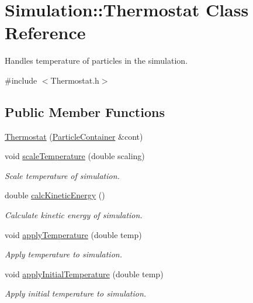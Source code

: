\hypertarget{classSimulation_1_1Thermostat}{\section{Simulation\-:\-:Thermostat Class Reference}
\label{classSimulation_1_1Thermostat}
}


Handles temperature of particles in the simulation.  




{\ttfamily \#include $<$Thermostat.\-h$>$}

\subsection*{Public Member Functions}
\begin{DoxyCompactItemize}
\item 
\hyperlink{classSimulation_1_1Thermostat_a3132362562357ff26f7bb02fa9ed59e0}{Thermostat} (\hyperlink{classSimulation_1_1ParticleContainer}{Particle\-Container} \&cont)
\item 
void \hyperlink{classSimulation_1_1Thermostat_a6d7ef0a0e8dc0aadee57630d63938f7d}{scale\-Temperature} (double scaling)
\begin{DoxyCompactList}\small\item\em Scale temperature of simulation. \end{DoxyCompactList}\item 
double \hyperlink{classSimulation_1_1Thermostat_ac082f2cc212aa2ac0c7d364e96afdb32}{calc\-Kinetic\-Energy} ()
\begin{DoxyCompactList}\small\item\em Calculate kinetic energy of simulation. \end{DoxyCompactList}\item 
void \hyperlink{classSimulation_1_1Thermostat_adac7020482a6f258d5d4757099016c22}{apply\-Temperature} (double temp)
\begin{DoxyCompactList}\small\item\em Apply temperature to simulation. \end{DoxyCompactList}\item 
void \hyperlink{classSimulation_1_1Thermostat_a37f1ec4f15eaeb89580d3fd28a0c984f}{apply\-Initial\-Temperature} (double temp)
\begin{DoxyCompactList}\small\item\em Apply initial temperature to simulation. \end{DoxyCompactList}\end{DoxyCompactItemize}
